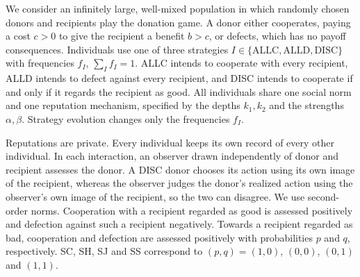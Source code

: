 \documentclass[10pt]{wlscirep}
\newcommand{\ALLC}{\mathrm{ALLC}}
\newcommand{\ALLD}{\mathrm{ALLD}}
\newcommand{\DISC}{\mathrm{DISC}}
\theoremstyle{plain}
\theoremstyle{remark}
\begin{document}
We consider an infinitely large, well-mixed population in which randomly chosen donors and recipients play the donation game. A donor either cooperates, paying a cost $c>0$ to give the recipient a benefit $b>c$, or defects, which has no payoff consequences. Individuals use one of three strategies $I\in\{\ALLC,\ALLD,\DISC\}$ with frequencies $f_I$, $\sum_If_I=1$. ALLC intends to cooperate with every recipient, ALLD intends to defect against every recipient, and DISC intends to cooperate if and only if it regards the recipient as good. All individuals share one social norm and one reputation mechanism, specified by the depths $k_1,k_2$ and the strengths $\alpha,\beta$. Strategy evolution changes only the frequencies $f_I$.

Reputations are private\cite{okada2018,hilbe2018,radzvilavicius2019}. Every individual keeps its own record of every other individual. In each interaction, an observer drawn independently of donor and recipient assesses the donor. A DISC donor chooses its action using its own image of the recipient, whereas the observer judges the donor's realized action using the observer's own image of the recipient, so the two can disagree. We use second-order norms\cite{ohtsuki2004}. Cooperation with a recipient regarded as good is assessed positively and defection against such a recipient negatively. Towards a recipient regarded as bad, cooperation and defection are assessed positively with probabilities $p$ and $q$, respectively. SC, SH, SJ and SS correspond to $(p,q)=(1,0)$, $(0,0)$, $(0,1)$ and $(1,1)$.
\end{document}
